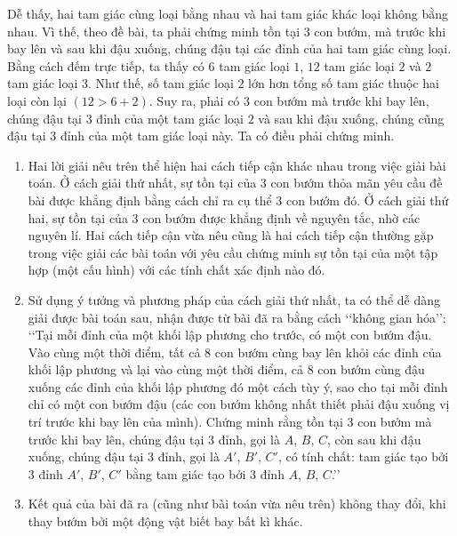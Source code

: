 \begin{bt}
{\begin{enumerate}[\bf Cách \bf 1:]
\begin{center}
\end{center}
Dễ thấy, hai tam giác cùng loại bằng nhau và hai tam giác khác loại không bằng nhau. Vì thế, theo đề bài, ta phải chứng minh tồn tại $3$ con bướm, mà trước khi bay lên và sau khi đậu xuống, chúng đậu tại các đỉnh của hai tam giác cùng loại.\\
Bằng cách đếm trực tiếp, ta thấy có $6$ tam giác loại $1$, $12$ tam giác loại $2$ và $2$ tam giác loại $3$. Như thế, số tam giác loại $2$ lớn hơn tổng số tam giác thuộc hai loại còn lại $(12>6+2)$. Suy ra, phải có $3$ con bướm mà trước khi bay lên, chúng đậu tại $3$ đỉnh của một tam giác loại $2$ và sau khi đậu xuống, chúng cũng đậu tại $3$ đỉnh của một tam giác loại này. Ta có điều phải chứng minh.
\end{enumerate}
\begin{nx}\hfill
\begin{enumerate}[\bf 1.]
\item Hai lời giải nêu trên thể hiện hai cách tiếp cận khác nhau trong việc giải bài toán. Ở cách giải thứ nhất, sự tồn tại của $3$ con bướm thỏa mãn yêu cầu đề bài được khẳng định bằng cách chỉ ra cụ thể $3$ con bướm đó. Ở cách giải thứ hai, sự tồn tại của $3$ con bướm được khẳng định về nguyên tắc, nhờ các nguyên lí. Hai cách tiếp cận vừa nêu cũng là hai cách tiếp cận thường gặp trong việc giải các bài toán với yêu cầu chứng minh sự tồn tại của một tập hợp (một cấu hình) với các tính chất xác định nào đó.
\item Sử dụng ý tưởng và phương pháp của cách giải thứ nhất, ta có thể dễ dàng giải được bài toán sau, nhận được từ bài đã ra bằng cách \lq\lq không gian hóa\rq\rq:\\
\lq\lq Tại mỗi đỉnh của một khối lập phương cho trước, có một con bướm đậu. Vào cùng một thời điểm, tất cả $8$ con bướm cùng bay lên khỏi các đỉnh của khối lập phương và lại vào cùng một thời điểm, cả $8$ con bướm cùng đậu xuống các đỉnh của khối lập phương đó một cách tùy ý, sao cho tại mỗi đỉnh chỉ có một con bướm đậu (các con bướm không nhất thiết phải đậu xuống vị trí trước khi bay lên của mình). Chứng minh rằng tồn tại $3$ con bướm mà trước khi bay lên, chúng đậu tại $3$ đỉnh, gọi là $A$, $B$, $C$, còn sau khi đậu xuống, chúng đậu tại $3$ đỉnh, gọi là $A'$, $B'$, $C'$, có tính chất: tam giác tạo bởi $3$ đỉnh $A'$, $B'$, $C'$ bằng tam giác tạo bởi $3$ đỉnh $A$, $B$, $C$.\rq\rq
\item Kết quả của bài đã ra (cũng như bài toán vừa nêu trên) không thay đổi, khi thay bướm bởi một động vật biết bay bất kì khác.
\end{enumerate}
\end{nx}
}
\end{bt}


